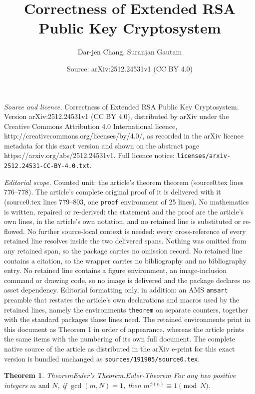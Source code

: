 \documentclass[10pt,a4paper]{amsart}
\title{Correctness of Extended RSA Public Key Cryptosystem}
\author{Dar-jen Chang, Suranjan Gautam}
\date{Source: arXiv:2512.24531v1 (CC BY 4.0)}
\newtheorem{theorem}{Theorem}
\begin{document}
\maketitle

\noindent\emph{Source and licence.} Correctness of Extended RSA Public Key Cryptosystem. Version arXiv:2512.24531v1 (CC BY 4.0), distributed by arXiv under the Creative Commons Attribution 4.0 International licence, http://creativecommons.org/licenses/by/4.0/, as recorded in the arXiv licence metadata for this exact version and shown on the abstract page https://arxiv.org/abs/2512.24531v1. Full licence notice: \texttt{licenses/arxiv-2512.24531-CC-BY-4.0.txt}.\par\smallskip

\noindent\textit{Editorial scope.} Counted unit: the article's theorem theorem (source0.tex lines 776--778). The article's complete original proof of it is delivered with it (source0.tex lines 779--803, one \texttt{proof} environment of 25 lines). No mathematics is written, repaired or re-derived: the statement and the proof are the article's own lines, in the article's own notation, and no retained line is substituted or re-flowed.  No further source-local context is needed: every cross-reference of every retained line resolves inside the two delivered spans.  Nothing was omitted from any retained span, so the package carries no omission record.  No retained line contains a citation, so the wrapper carries no bibliography and no bibliography entry.  No retained line contains a figure environment, an image-inclusion command or drawing code, so no image is delivered and the package declares no asset dependency.  Editorial formatting only, in addition: an AMS \texttt{amsart} preamble that restates the article's own declarations and macros used by the retained lines, namely the environments \texttt{theorem} on separate counters, together with the standard packages those lines need.  The retained environments print in this document as Theorem 1 in order of appearance, whereas the article prints the same items with the numbering of its own full document.  The complete native source of the article as distributed in the arXiv e-print for this exact version is bundled unchanged as \texttt{sources/191905/source0.tex}.
\begin{theorem}{Theorem}{Euler's Theorem.}{}{Euler-Theorem}%
For any two positive integers \(m \text{ and } N\), if \(\gcd(m,N) = 1\), then \(m^{\phi(n)} \equiv 1 \pmod N\).%
\end{theorem}
\end{document}
